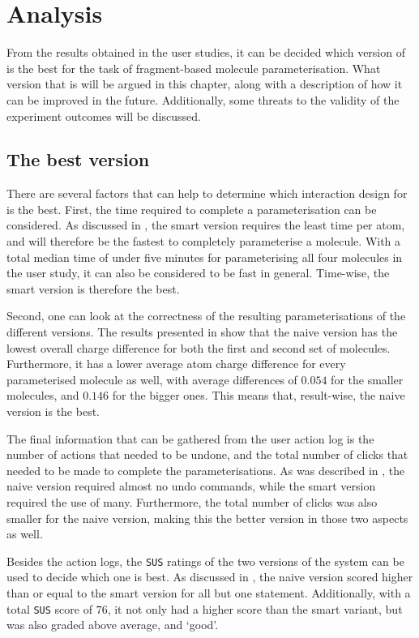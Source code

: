 \chapter{Analysis}

From the results obtained in the user studies, it can be decided which version of \oframp{} is the best for the task of fragment-based molecule parameterisation. What version that is will be argued in this chapter, along with a description of how it can be improved in the future. Additionally, some threats to the validity of the experiment outcomes will be discussed.


\section{The best version}
There are several factors that can help to determine which interaction design for \oframp{} is the best. First, the time required to complete a parameterisation can be considered. As discussed in , the smart version requires the least time per atom, and will therefore be the fastest to completely parameterise a molecule. With a total median time of under five minutes for parameterising all four molecules in the user study, it can also be considered to be fast in general. Time-wise, the smart version is therefore the best.

Second, one can look at the correctness of the resulting parameterisations of the different versions. The results presented in  show that the naive version has the lowest overall charge difference for both the first and second set of molecules. Furthermore, it has a lower average atom charge difference for every parameterised molecule as well, with average differences of $0.054$ for the smaller molecules, and $0.146$ for the bigger ones. This means that, result-wise, the naive version is the best.

The final information that can be gathered from the user action log is the number of actions that needed to be undone, and the total number of clicks that needed to be made to complete the parameterisations. As was described in , the naive version required almost no undo commands, while the smart version required the use of many. Furthermore, the total number of clicks was also smaller for the naive version, making this the better version in those two aspects as well.

Besides the action logs, the \verb|SUS| ratings of the two versions of the system can be used to decide which one is best. As discussed in , the naive version scored higher than or equal to the smart version for all but one statement. Additionally, with a total \verb|SUS| score of $76$, it not only had a higher score than the smart variant, but was also graded above average, and `good'.

